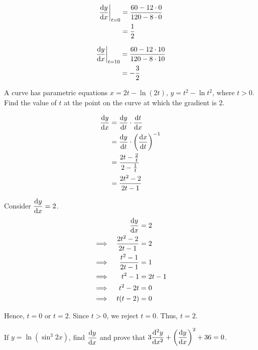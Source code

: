 \documentclass{echw}
\begin{document}
        \begin{align*}
            \left.\dfrac{\mathrm{d} y}{\mathrm{d} x}\right|_{t = 0} &= \dfrac{60 - 12\cdot 0}{120 - 8\cdot0}\\
            &= \dfrac12
        \end{align*}

        \begin{align*}
            \left.\dfrac{\mathrm{d} y}{\mathrm{d} x}\right|_{t = 10} &= \dfrac{60 - 12\cdot 10}{120 - 8\cdot10}\\
            &= -\dfrac32
        \end{align*}


    \problem{}
        A curve has parametric equations $x = 2t-\ln (2t), \, y = t^2 - \ln t^2$, where $t > 0$. Find the value of $t$ at the point on the curve at which the gradient is 2.

    \solution
        \begin{align*}
            \dfrac{\mathrm{d} y}{\mathrm{d} x} &= \dfrac{\mathrm{d} y}{\mathrm{d} t} \cdot \dfrac{\mathrm{d} t}{\mathrm{d} x}\\
            &= \dfrac{\mathrm{d} y}{\mathrm{d} t} \cdot \left(\dfrac{\mathrm{d} x}{\mathrm{d} t}\right)^{-1}\\
            &= \dfrac{2t - \tfrac2t}{2 - \tfrac1t}\\
            &= \dfrac{2t^2 - 2}{2t - 1}
        \end{align*}

        Consider $\dfrac{\mathrm{d} y}{\mathrm{d} x} = 2$.
        \begin{alignat*}{2}
            &&\dfrac{\mathrm{d} y}{\mathrm{d} x} &= 2\\
            \implies&&\dfrac{2t^2 - 2}{2t - 1} &= 2\\
            \implies&&\dfrac{t^2 - 1}{2t - 1} &= 1\\
            \implies&&t^2 - 1 &= 2t -1\\
            \implies&&t^2 - 2t &= 0\\
            \implies&&t(t-2) &= 0
        \end{alignat*}

        Hence, $t = 0$ or $t = 2$. Since $t > 0$, we reject $t = 0$. Thus, $t = 2$.


    \problem{}
        If $y = \ln \left(\sin^3 2x\right)$, find $\dfrac{\mathrm{d} y}{\mathrm{d} x}$ and prove that $3\dfrac{\mathrm{d}^{2} y}{\mathrm{d} {x}^{2}} + \left(\dfrac{\mathrm{d} y}{\mathrm{d} x}\right)^2 + 36 = 0$.
\end{document}
